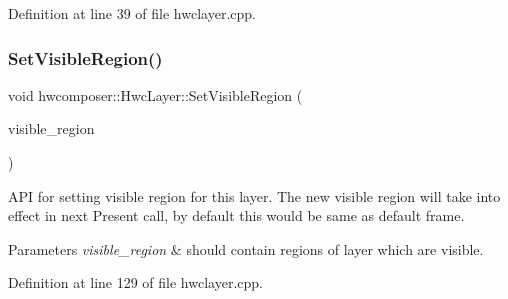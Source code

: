 Definition at line 39 of file hwclayer.\+cpp.


\begin{DoxyCode}{0}
\end{DoxyCode}
\mbox{\label{structhwcomposer_1_1HwcLayer_a27744cfd952d0648168a1d28c65ff092}} 
\subsubsection{\texorpdfstring{Set\+Visible\+Region()}{SetVisibleRegion()}}
{\footnotesize\ttfamily void hwcomposer\+::\+Hwc\+Layer\+::\+Set\+Visible\+Region (\begin{DoxyParamCaption}\item[{const Hwc\+Region \&}]{visible\+\_\+region }\end{DoxyParamCaption})}

A\+PI for setting visible region for this layer. The new visible region will take into effect in next Present call, by default this would be same as default frame. 
\begin{DoxyParams}{Parameters}
{\em visible\+\_\+region} & should contain regions of layer which are visible. \\
\hline
\end{DoxyParams}


Definition at line 129 of file hwclayer.\+cpp.


